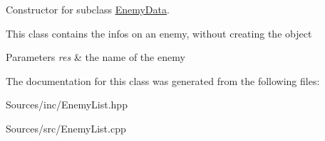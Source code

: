 Constructor for subclass \hyperlink{class_enemy_list_1_1_enemy_data}{Enemy\+Data}. 

This class contains the infos on an enemy, without creating the object 
\begin{DoxyParams}{Parameters}
{\em res} & the name of the enemy \\
\hline
\end{DoxyParams}


The documentation for this class was generated from the following files\+:\begin{DoxyCompactItemize}
\item 
Sources/inc/Enemy\+List.\+hpp\item 
Sources/src/Enemy\+List.\+cpp\end{DoxyCompactItemize}
